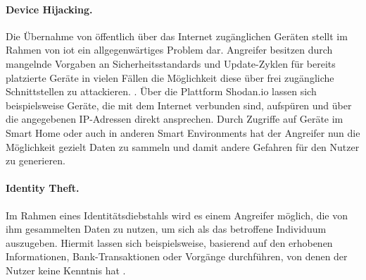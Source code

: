
\paragraph{Device Hijacking.}
\label{sec:Grundlagen:para:Device Hijacking}
Die Übernahme von öffentlich über das Internet zugänglichen Geräten stellt im Rahmen von \ac{iot} ein allgegenwärtiges Problem dar. Angreifer besitzen durch mangelnde Vorgaben an Sicherheitsstandards und Update-Zyklen für bereits platzierte Geräte in vielen Fällen die Möglichkeit diese über frei zugängliche Schnittstellen zu attackieren. \cite{SecPrivSmartCity2021}. Über die Plattform Shodan.io \cite{Shodan2022} lassen sich beispielsweise Geräte, die mit dem Internet verbunden sind, aufspüren und über die angegebenen IP-Adressen direkt ansprechen. Durch Zugriffe auf Geräte im Smart Home oder auch in anderen Smart Environments hat der Angreifer nun die Möglichkeit gezielt Daten zu sammeln und damit andere Gefahren für den Nutzer zu generieren.


\paragraph{Identity Theft.}
\label{sec:Grundlagen:para:Identity Theft}
Im Rahmen eines Identitätsdiebstahls wird es einem Angreifer möglich, die von ihm gesammelten Daten zu nutzen, um sich als das betroffene Individuum auszugeben. Hiermit lassen sich beispielsweise, basierend auf den erhobenen Informationen, Bank-Transaktionen oder Vorgänge durchführen, von denen der Nutzer keine Kenntnis hat \cite{SecPrivSmartCity2021}.


